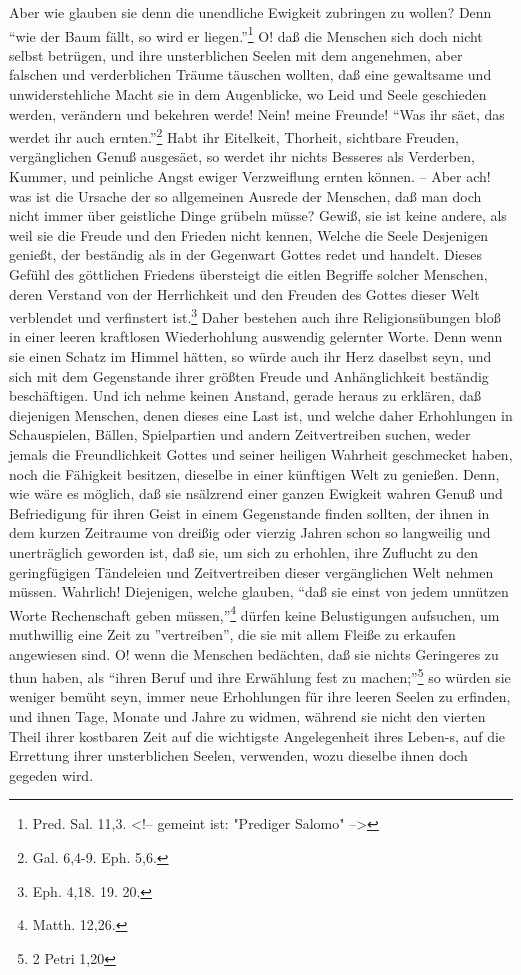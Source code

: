 Aber wie glauben sie denn die unendliche Ewigkeit zubringen zu wollen? Denn "`wie der Baum fällt, so wird er liegen."'\footnote{Pred. Sal. 11,3. <!-- gemeint ist: "Prediger Salomo" -->} O! daß die Menschen sich doch nicht selbst betrügen, und ihre unsterblichen Seelen mit dem angenehmen, aber falschen und verderblichen Träume täuschen wollten, daß eine gewaltsame und unwiderstehliche Macht sie in dem Augenblicke, wo Leid und Seele geschieden werden, verändern und bekehren werde! Nein! meine Freunde! "`Was ihr säet, das werdet ihr auch ernten."'\footnote{Gal. 6,4-9. Eph. 5,6.} Habt ihr Eitelkeit, Thorheit, sichtbare Freuden, vergänglichen Genuß ausgesäet, so werdet ihr nichts Besseres als Verderben, Kummer, und peinliche Angst ewiger Verzweiflung ernten können. -- Aber ach! was ist die Ursache der so allgemeinen Ausrede der Menschen, daß man doch nicht immer über geistliche Dinge grübeln müsse? Gewiß, sie ist keine andere, als weil sie die Freude und den Frieden nicht kennen, Welche die Seele Desjenigen genießt, der beständig als in der Gegenwart Gottes redet und handelt. Dieses Gefühl des göttlichen Friedens übersteigt die eitlen Begriffe solcher Menschen, deren Verstand von der Herrlichkeit und den Freuden des Gottes dieser Welt verblendet und verfinstert ist.\footnote{Eph. 4,18. 19. 20.} Daher bestehen auch ihre Religionsübungen bloß in einer leeren kraftlosen Wiederhohlung auswendig gelernter Worte. Denn wenn sie einen Schatz im Himmel hätten, so würde auch ihr Herz daselbst seyn, und sich mit dem Gegenstande ihrer größten Freude und Anhänglichkeit beständig beschäftigen. Und ich nehme keinen Anstand, gerade heraus zu erklären, daß diejenigen Menschen, denen dieses eine Last ist, und welche daher Erhohlungen in Schauspielen, Bällen, Spielpartien und andern Zeitvertreiben suchen, weder jemals die Freundlichkeit Gottes und seiner heiligen Wahrheit geschmecket haben, noch die Fähigkeit besitzen, dieselbe in einer künftigen Welt zu genießen. Denn, wie wäre es möglich, daß sie nsälzrend einer ganzen Ewigkeit wahren Genuß und Befriedigung für ihren Geist in einem Gegenstande finden sollten, der ihnen in dem kurzen Zeitraume von dreißig oder vierzig Jahren schon so langweilig und unerträglich geworden ist, daß sie, um sich zu erhohlen, ihre Zuflucht zu den geringfügigen Tändeleien und Zeitvertreiben dieser vergänglichen Welt nehmen müssen. Wahrlich! Diejenigen, welche glauben,  "`daß sie einst von jedem unnützen Worte Rechenschaft geben müssen,"'\footnote{Matth. 12,26.} dürfen keine Belustigungen aufsuchen, um muthwillig eine Zeit zu ''vertreiben'', die sie mit allem Fleiße zu erkaufen angewiesen sind. O! wenn die Menschen bedächten, daß sie nichts Geringeres zu thun haben, als "`ihren Beruf und ihre Erwählung fest zu machen;"'\footnote{2 Petri 1,20} so würden sie weniger bemüht seyn, immer neue Erhohlungen für ihre leeren Seelen zu erfinden, und ihnen Tage, Monate und Jahre zu widmen, während sie nicht den vierten Theil ihrer kostbaren Zeit auf die wichtigste Angelegenheit ihres Leben-s, auf die Errettung ihrer unsterblichen Seelen, verwenden, wozu dieselbe ihnen doch gegeden wird.

